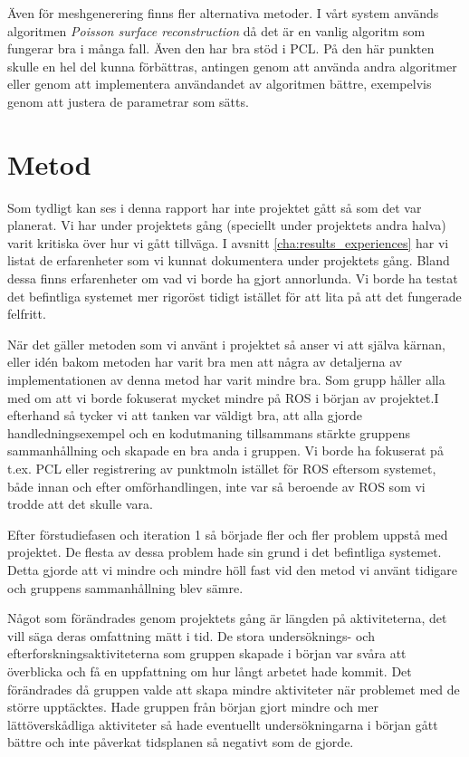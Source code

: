 Även för meshgenerering finns fler alternativa metoder. I vårt system används algoritmen \textit{Poisson surface reconstruction} då det är en vanlig algoritm som fungerar bra i många fall. Även den har bra stöd i PCL. På den här punkten skulle en hel del kunna förbättras, antingen genom att använda andra algoritmer eller genom att implementera användandet av algoritmen bättre, exempelvis genom att justera de parametrar som sätts.


\section{Metod}
\label{sec:discussion-method}
Som tydligt kan ses i denna rapport har inte projektet gått så som det var planerat. Vi har under projektets gång (speciellt under projektets andra halva) varit kritiska över hur vi gått tillväga. I avsnitt \ref{cha:results_experiences} har vi listat de erfarenheter som vi kunnat dokumentera under projektets gång. Bland dessa finns erfarenheter om vad vi borde ha gjort annorlunda. Vi borde ha testat det befintliga systemet mer rigoröst tidigt istället för att lita på att det fungerade felfritt.

När det gäller metoden som vi använt i projektet så anser vi att själva kärnan, eller idén bakom metoden har varit bra men att några av detaljerna av implementationen av denna metod har varit mindre bra. Som grupp håller alla med om att vi borde fokuserat mycket mindre på ROS i början av projektet.I efterhand så tycker vi att tanken var väldigt bra, att alla gjorde handledningsexempel och en kodutmaning tillsammans stärkte gruppens sammanhållning och skapade en bra anda i gruppen. Vi borde ha fokuserat på t.ex. PCL eller registrering av punktmoln istället för ROS eftersom systemet, både innan och efter omförhandlingen, inte var så beroende av ROS som vi trodde att det skulle vara.

Efter förstudiefasen och iteration 1 så började fler och fler problem uppstå med projektet. De flesta av dessa problem hade sin grund i det befintliga systemet. Detta gjorde att vi mindre och mindre höll fast vid den metod vi använt tidigare och gruppens sammanhållning blev sämre.

Något som förändrades genom projektets gång är längden på aktiviteterna, det vill säga deras omfattning mätt i tid. De stora undersöknings- och efterforskningsaktiviteterna som gruppen skapade i början var svåra att överblicka och få en uppfattning om hur långt arbetet hade kommit. Det förändrades då gruppen valde att skapa mindre aktiviteter när problemet med de större upptäcktes. Hade gruppen från början gjort mindre och mer lättöverskådliga aktiviteter så hade eventuellt undersökningarna i början gått bättre och inte påverkat tidsplanen så negativt som de gjorde.

